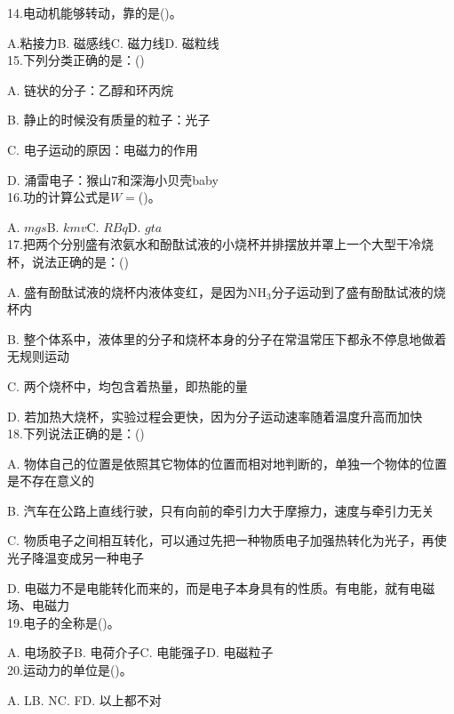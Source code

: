 \documentclass[UTF8,12pt,oneside]{ctexbook}
\begin{document}
    14.电动机能够转动，靠的是(\qquad)。
    
    A.粘接力\qquad B. 磁感线\qquad C. 磁力线\qquad D. 磁粒线
    ~\\
    
    15.下列分类正确的是：(\qquad)
    
    A. 链状的分子：乙醇和环丙烷
    
    B. 静止的时候没有质量的粒子：光子
    
    C. 电子运动的原因：电磁力的作用
    
    D. 涌雷电子：猴山7和深海小贝壳baby
    ~\\
    
    16.功的计算公式是$W=$(\qquad)。
    
    A. $mgs$\qquad B. $kmv$\qquad C. $RBq$\qquad D. $gta$
    ~\\
    
    17.把两个分别盛有浓氨水和酚酞试液的小烧杯并排摆放并罩上一个大型干冷烧杯，说法正确的是：(\qquad)
    
    A. 盛有酚酞试液的烧杯内液体变红，是因为NH$_3$分子运动到了盛有酚酞试液的烧杯内
    
    B. 整个体系中，液体里的分子和烧杯本身的分子在常温常压下都永不停息地做着无规则运动
    
    C. 两个烧杯中，均包含着热量，即热能的量
    
    D. 若加热大烧杯，实验过程会更快，因为分子运动速率随着温度升高而加快
    ~\\
    
    18.下列说法正确的是：(\qquad)
    
    A. 物体自己的位置是依照其它物体的位置而相对地判断的，单独一个物体的位置是不存在意义的
    
    B. 汽车在公路上直线行驶，只有向前的牵引力大于摩擦力，速度与牵引力无关
    
    C. 物质电子之间相互转化，可以通过先把一种物质电子加强热转化为光子，再使光子降温变成另一种电子
    
    D. 电磁力不是电能转化而来的，而是电子本身具有的性质。有电能，就有电磁场、电磁力
    ~\\
    
    19.电子的全称是(\qquad)。
    
    A. 电场胶子\qquad B. 电荷介子\qquad C. 电能强子\qquad D. 电磁粒子
    ~\\
    
    20.运动力的单位是(\qquad)。
    
    A. L\qquad B. N\qquad C. F\qquad D. 以上都不对 
    ~\\
    
\end{document}
